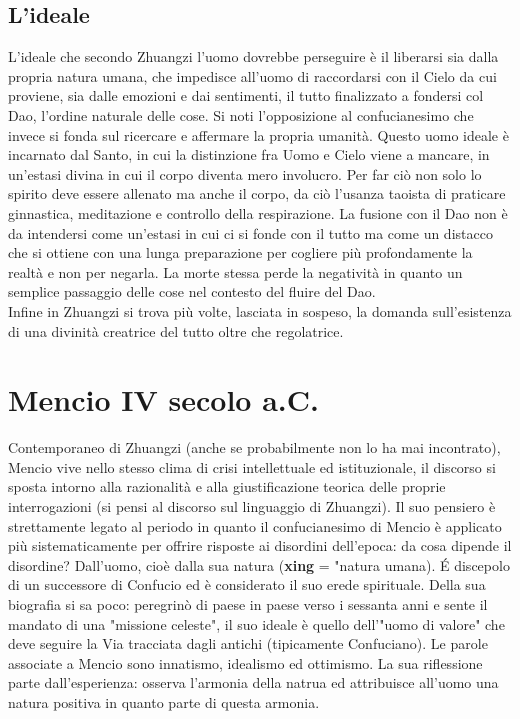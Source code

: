\documentclass[10pt,a4paper]{report}
\begin{document}
\subsection{L'ideale}
L'ideale che secondo Zhuangzi l'uomo dovrebbe perseguire è il liberarsi sia dalla propria natura umana, che impedisce all'uomo di raccordarsi con il Cielo da cui proviene, sia dalle emozioni e dai sentimenti, il tutto finalizzato a fondersi col Dao, l'ordine naturale delle cose. Si noti l'opposizione al confucianesimo che invece si fonda sul ricercare e affermare la propria umanità. Questo uomo ideale è incarnato dal Santo, in cui la distinzione fra Uomo e Cielo viene a mancare, in un'estasi divina in cui il corpo diventa mero involucro. Per far ciò non solo lo spirito deve essere allenato ma anche il corpo, da ciò l'usanza taoista di praticare ginnastica, meditazione e controllo della respirazione. La fusione con il Dao non è da intendersi come un'estasi in cui ci si fonde con il tutto ma come un distacco che si ottiene con una lunga preparazione per cogliere più profondamente la realtà e non per negarla. La morte stessa perde la negatività in quanto un semplice passaggio delle cose nel contesto del fluire del Dao.\\ 
Infine in Zhuangzi si trova più volte, lasciata in sospeso, la domanda sull'esistenza di una divinità creatrice del tutto oltre che regolatrice.

\section{Mencio IV secolo a.C.}
Contemporaneo di Zhuangzi (anche se probabilmente non lo ha mai incontrato), Mencio vive nello stesso clima di crisi intellettuale ed istituzionale, il discorso si sposta intorno alla razionalità e alla giustificazione teorica delle proprie interrogazioni (si pensi al discorso sul linguaggio di Zhuangzi). Il suo pensiero è strettamente legato al periodo in quanto il confucianesimo di Mencio è applicato più sistematicamente per offrire risposte ai disordini dell'epoca: da cosa dipende il disordine? Dall'uomo, cioè dalla sua natura (\textbf{xing} = "natura umana). \'E discepolo di un successore di Confucio ed è considerato il suo erede spirituale. Della sua biografia si sa poco: peregrinò di paese in paese verso i sessanta anni e sente il mandato di una "missione celeste", il suo ideale è quello dell'"uomo di valore" che deve seguire la Via tracciata dagli antichi (tipicamente Confuciano). Le parole associate a Mencio sono innatismo, idealismo ed ottimismo. La sua riflessione parte dall'esperienza: osserva l'armonia della natrua ed attribuisce all'uomo una natura positiva in quanto parte di questa armonia.
\end{document}

